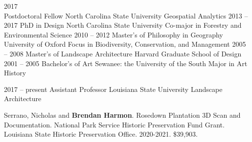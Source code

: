 \documentclass[10pt]{developercv} %
\begin{document}

\begin{entrylist}
	\entry
		{2017\\\footnotesize{}}
		{Postdoctoral Fellow}
		{North Carolina State University}
		{Geospatial Analytics
		}
	\entry
		{2013 -- 2017}
		{PhD in Design}
		{North Carolina State University}
		{Co-major in Forestry and Environmental Science}
	\entry
		{2010 -- 2012}
		{Master's of Philosophy in Geography}
		{University of Oxford}
		{Focus in Biodiversity, Conservation, and Management}
	\entry
		{2005 -- 2008}
		{Master's of Landscape Architecture}
		{Harvard Graduate School of Design}
		{}
	\entry
		{2001 -- 2005}
		{Bachelor's of Art}
		{Sewanee: the University of the South}
		{Major in Art History}
\end{entrylist}


\vspace*{-0.25cm}

\begin{entrylist}
	\entry
		{2017 -- present}
		{Assistant Professor}
		{Louisiana State University}
		{Landscape Architecture}
\end{entrylist}


\vspace*{-0.25cm}
\nocite{*}
\setlength\bibitemsep{0.75em}

\printbibliography[title={}, keyword=significant, heading=none]



Serrano, Nicholas and \textbf{Brendan Harmon}. 
Rosedown Plantation 3D Scan and Documentation. 
National Park Service Historic Preservation Fund Grant. Louisiana State Historic Preservation Office. 
2020-2021. \$39,903.\\
\end{document}
